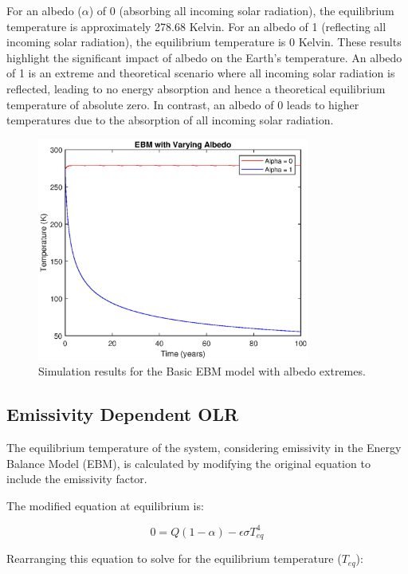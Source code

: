 \documentclass[12pt]{article}
\begin{document}
For an albedo ($\alpha$) of 0 (absorbing all incoming solar radiation), 
the equilibrium temperature is approximately 278.68 Kelvin.
For an albedo of 1 (reflecting all incoming solar radiation), 
the equilibrium temperature is 0 Kelvin.
These results highlight the significant impact of albedo on the Earth's temperature. 
An albedo of 1 is an extreme and theoretical scenario 
where all incoming solar radiation is reflected, 
leading to no energy absorption 
and hence a theoretical equilibrium temperature of absolute zero. 
In contrast, an albedo of 0 leads to higher temperatures 
due to the absorption of all incoming solar radiation. 

\begin{figure}[ht]
\centering
\includegraphics[width=0.8\textwidth]{images/albedo_extremes.eps}
\caption{Simulation results for the Basic EBM model with albedo extremes.}
\label{fig:albedoExtremes}
\end{figure}

\subsection{Emissivity Dependent OLR}
The equilibrium temperature of the system, 
considering emissivity in the Energy Balance Model (EBM), 
is calculated by modifying the original equation 
to include the emissivity factor. 

The modified equation at equilibrium is:

\begin{equation}
0 = Q(1 - \alpha) - \epsilon\sigma T_{eq}^4
\end{equation}

Rearranging this equation to solve for the equilibrium temperature ($T_{eq}$):
\end{document}

